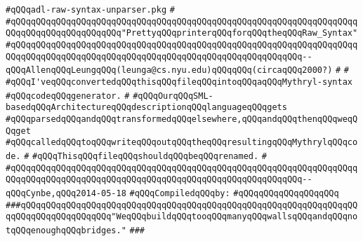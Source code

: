 \label{src/lib/compiler/back/low/tools/adl-syntax/adl-raw-syntax-unparser.pkg}
\verb|#qQQqadl-raw-syntax-unparser.pkg|\newline
\verb|#|\newline
\verb|#qQQqqQQqqQQqqQQqqQQqqQQqqQQqqQQqqQQqqQQqqQQqqQQqqQQqqQQqqQQqqQQqqQQqqQQqqQQqqQQqqQQqqQQqqQQq"PrettyqQQqprinterqQQqforqQQqtheqQQqRaw_Syntax"|\newline
\verb|#qQQqqQQqqQQqqQQqqQQqqQQqqQQqqQQqqQQqqQQqqQQqqQQqqQQqqQQqqQQqqQQqqQQqqQQqqQQqqQQqqQQqqQQqqQQqqQQqqQQqqQQqqQQqqQQqqQQqqQQqqQQqqQQq--qQQqAllenqQQqLeungqQQq(leunga@cs.nyu.edu)qQQqqQQq(circaqQQq2000?)|\newline
\verb|#|\newline
\verb|#|\newline
\verb|#qQQqI'veqQQqconvertedqQQqthisqQQqfileqQQqintoqQQqaqQQqMythryl-syntax|\newline
\verb|#qQQqcodeqQQqgenerator.|\newline
\verb|#|\newline
\verb|#qQQqOurqQQqSML-basedqQQqArchitectureqQQqdescriptionqQQqlanguageqQQqgets|\newline
\verb|#qQQqparsedqQQqandqQQqtransformedqQQqelsewhere,qQQqandqQQqthenqQQqweqQQqget|\newline
\verb|#qQQqcalledqQQqtoqQQqwriteqQQqoutqQQqtheqQQqresultingqQQqMythrylqQQqcode.|\newline
\verb|#|\newline
\verb|#qQQqThisqQQqfileqQQqshouldqQQqbeqQQqrenamed.|\newline
\verb|#|\newline
\verb|#qQQqqQQqqQQqqQQqqQQqqQQqqQQqqQQqqQQqqQQqqQQqqQQqqQQqqQQqqQQqqQQqqQQqqQQqqQQqqQQqqQQqqQQqqQQqqQQqqQQqqQQqqQQqqQQqqQQqqQQqqQQqqQQq--qQQqCynbe,qQQq2014-05-18|\newline
\newline
\verb|#qQQqCompiledqQQqby:|\newline
\verb|#qQQqqQQqqQQqqQQqqQQq|\newline
\newline
\newline
\newline
\newline
\verb|###qQQqqQQqqQQqqQQqqQQqqQQqqQQqqQQqqQQqqQQqqQQqqQQqqQQqqQQqqQQqqQQqqQQqqQQqqQQqqQQqqQQqqQQq"WeqQQqbuildqQQqtooqQQqmanyqQQqwallsqQQqandqQQqnotqQQqenoughqQQqbridges."|\newline
\verb|###|\newline
